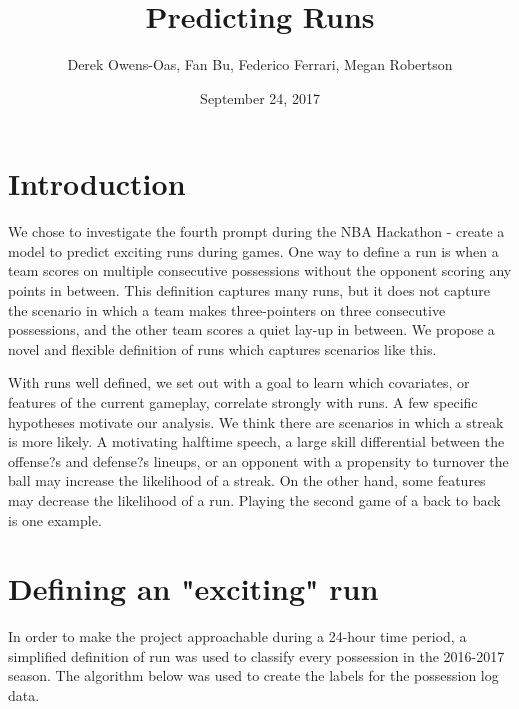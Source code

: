 \documentclass{article}
\title{Predicting Runs}
\author{Derek Owens-Oas, Fan Bu, Federico Ferrari, Megan Robertson}
\date{September 24, 2017}
\begin{document}
\maketitle

\section{Introduction}

We chose to investigate the fourth prompt during the NBA Hackathon - create a model to predict exciting runs during games. One way to define a run is when a team scores on multiple consecutive possessions without the opponent scoring any points in between. This definition captures many runs, but it does not capture the scenario in which a team makes three-pointers on three consecutive possessions, and the other team scores a quiet lay-up in between. We propose a novel and flexible definition of runs which captures scenarios like this. \newline

With runs well defined, we set out with a goal to learn which covariates, or features of the current gameplay, correlate strongly with runs. A few specific hypotheses motivate our analysis. We think there are scenarios in which a streak is more likely. A motivating halftime speech, a large skill differential between the offense?s and defense?s lineups, or an opponent with a propensity to turnover the ball may increase the likelihood of a streak. On the other hand, some features may decrease the likelihood of a run. Playing the second game of a back to back is one example.

\section{Defining an "exciting" run}

In order to make the project approachable during a 24-hour time period, a simplified definition of run was used to classify every possession in the 2016-2017 season. The algorithm below was used to create the labels for the possession log data. 
\end{document}
